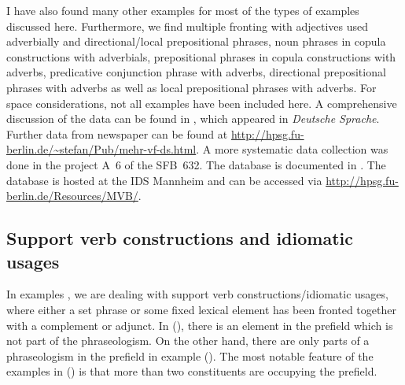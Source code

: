 I have also found many other examples for most of the types of examples discussed here. Furthermore, we find multiple fronting
with adjectives used adverbially and directional/local prepositional phrases, noun phrases in copula constructions with adverbials, 
prepositional phrases in copula constructions with adverbs, predicative conjunction phrase with adverbs, directional prepositional 
phrases with adverbs as well as local prepositional phrases with adverbs. For space considerations, not all examples have been included
here. A comprehensive discussion of the data can be found in \citep{Mueller2003b}, which appeared in \emph{Deutsche Sprache}.
Further data from newspaper can be found at
\url{http://hpsg.fu-berlin.de/~stefan/Pub/mehr-vf-ds.html}. A more systematic data collection was
done in the project A~6 of the SFB~632. The database is documented in . The
database is hosted at the IDS Mannheim and can be accessed via \url{http://hpsg.fu-berlin.de/Resources/MVB/}.



\subsection{Support verb constructions and idiomatic usages}
\label{sec-phraseolog}

In examples , we are dealing with support verb constructions/idiomatic usages, where
either a set phrase or some fixed lexical element has been fronted together with a complement or adjunct.
In (), there is an element in the prefield which is not part of the phraseologism. On the
other hand, there are only parts of a phraseologism in the prefield in example (). The most notable feature of the examples in 
() is that more than two constituents are occupying the prefield.


